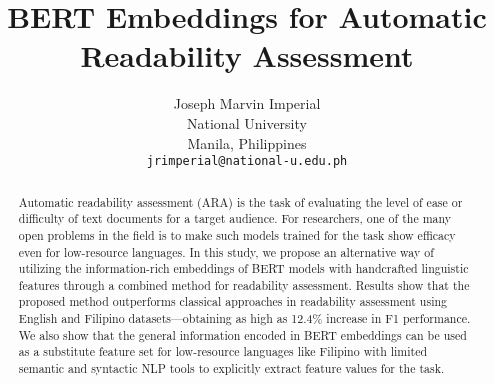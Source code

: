 \documentclass[11pt,a4paper]{article}
\title{BERT Embeddings for Automatic Readability Assessment}
\author{Joseph Marvin Imperial \\
  National University \\
  Manila, Philippines \\
  \texttt{jrimperial@national-u.edu.ph} \\
  }
\date{}
\begin{document}
\maketitle
\begin{abstract}
Automatic readability assessment (ARA) is the task of evaluating the level of ease or difficulty of text documents for a target audience. For researchers, one of the many open problems in the field is to make such models trained for the task show efficacy even for low-resource languages. In this study, we propose an alternative way of utilizing the information-rich embeddings of BERT models with handcrafted linguistic features through a combined method for readability assessment. Results show that the proposed method outperforms classical approaches in readability assessment using English and Filipino datasets—obtaining as high as 12.4\% increase in F1 performance. We also show that the general information encoded in BERT embeddings can be used as a substitute feature set for low-resource languages like Filipino with limited semantic and syntactic NLP tools to explicitly extract feature values for the task.
\end{abstract}
\end{document}
